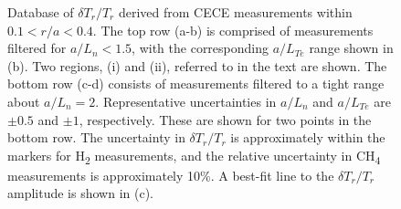 \documentclass[%
 aip,
 amsmath,amssymb,
 reprint,%
]{revtex4-1}
\begin{document}
\begin{figure}[!htbp]
\begin{subfigure}[]{.49\textwidth}
\end{subfigure}
\begin{subfigure}[]{.49\textwidth}
  \centering
\end{subfigure}

\caption{Database of $\delta T_r/T_r$  derived from CECE measurements within $0.1 < r/a < 0.4$. The top row (a-b) is comprised of measurements filtered for $a/L_n<1.5$, with the corresponding $a/L_{Te}$ range shown in (b). Two regions, (i) and (ii), referred to in the text are shown. The bottom row (c-d) consists of measurements filtered to a tight range about $a/L_n=2$. Representative uncertainties in $a/L_n$ and $a/L_{Te}$ are $\pm 0.5$ and $\pm 1$, respectively. These are shown for two points in the bottom row. The uncertainty in $\delta T_r/T_r$ is approximately within the markers for H\textsubscript{2} measurements, and the relative uncertainty in CH\textsubscript{4} measurements is approximately 10\%. A best-fit line to the $\delta T_r/T_r$ amplitude is shown in (c). }
\label{fig:full_db}
\end{figure}
\end{document}
